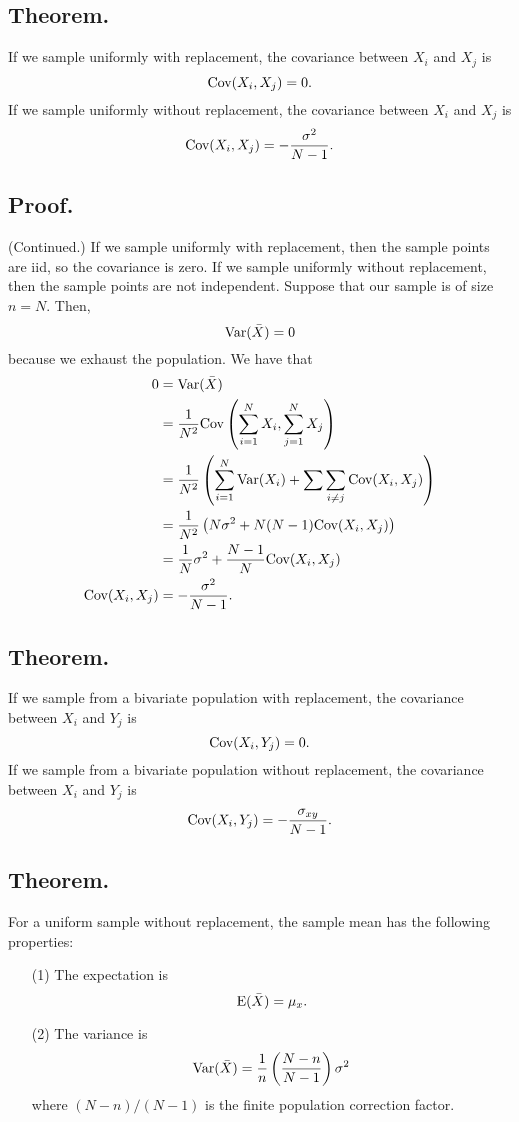 \documentclass[titlepage]{article}
\begin{document}
\subsection{Theorem.} If we sample uniformly with replacement, the covariance between $X_{i}$ and $X_{j}$ is 
$$\text{Cov}(X_{i}, X_{j}) = 0.$$
If we sample uniformly without replacement, the covariance between $X_{i}$ and $X_{j}$ is
$$\text{Cov}(X_{i}, X_{j}) = -\frac{\sigma^{2}}{N-1}.$$

\subsection{Proof.} (Continued.) If we sample uniformly with replacement, then the sample points are iid, so the covariance is zero. If we sample uniformly without replacement, then the sample points are not independent. Suppose that our sample is of size $n = N$. Then, 
$$\text{Var}(\bar{X}) = 0$$
because we exhaust the population. We have that 
\begin{align*}
                 0 &= \text{Var}(\bar{X}) \\
                   &= \frac{1}{N^{2}}\text{Cov}\left(\sum_{i=1}^{N}X_{i}, \sum_{j=1}^{N}X_{j}\right) \\
                   &= \frac{1}{N^{2}}\left(\sum_{i=1}^{N}\text{Var}(X_{i}) + \sum\sum_{i \neq j}\text{Cov}(X_{i}, X_{j})\right) \\
                   &= \frac{1}{N^{2}}\left(N\sigma^{2} + N(N-1)\text{Cov}(X_{i}, X_{j})\right) \\
                   &= \frac{1}{N}\sigma^{2} + \frac{N-1}{N}\text{Cov}(X_{i}, X_{j}) \\
\text{Cov}(X_{i}, X_{j}) &= -\frac{\sigma^{2}}{N-1}.
\end{align*}

\subsection{Theorem.} If we sample from a bivariate population with replacement, the covariance between $X_{i}$ and $Y_{j}$ is
$$\text{Cov}(X_{i}, Y_{j}) = 0.$$
If we sample from a bivariate population without replacement, the covariance between $X_{i}$ and $Y_{j}$ is
$$\text{Cov}(X_{i}, Y_{j}) = -\frac{\sigma_{xy}}{N-1}.$$

\subsection{Theorem.} For a uniform sample without replacement, the sample mean has the following properties:
\begin{enumerate}
\item[(1)] The expectation is 
$$\text{E}(\bar{X}) = \mu_{x}.$$
\item[(2)] The variance is 
$$\text{Var}(\bar{X}) = \frac{1}{n}\left(\frac{N-n}{N-1}\right)\sigma^{2}$$
where $(N-n)/(N-1)$ is the finite population correction factor.
\end{enumerate}
\end{document}
